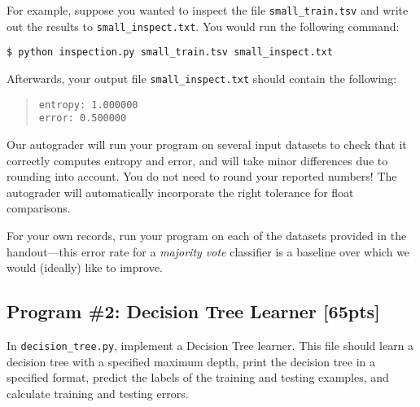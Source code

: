\documentclass[11pt,addpoints,answers]{exam}
\begin{document}
For example, suppose you wanted to inspect the file \lstinline{small_train.tsv} and write out the results to \lstinline{small_inspect.txt}. You would run the following command:
%
\begin{lstlisting}[language=Shell]
$ python inspection.py small_train.tsv small_inspect.txt
\end{lstlisting}
%
Afterwards, your output file \lstinline{small_inspect.txt} should contain the following:
%
\begin{quote}
\begin{verbatim}
entropy: 1.000000
error: 0.500000
\end{verbatim}
\end{quote}
%
Our autograder will run your program on several input datasets to check that it correctly computes entropy and error, and will take minor differences due to rounding into account. You do not need to round your reported numbers! The autograder will automatically incorporate the right tolerance for float comparisons.

\begin{notebox}
For your own records, run your program on each of the datasets provided in the handout---this error rate for a \emph{majority vote} classifier is a baseline over which we would (ideally) like to improve.
\end{notebox}

\newpage
\subsection{Program \#2: Decision Tree Learner [65pts]}
\label{sec:decisiontree}

In \texttt{decision\_tree.py}, implement a Decision Tree learner. This file should learn a decision tree with a specified maximum depth, print the decision tree in a specified format, predict the labels of the training and testing examples, and calculate training and testing errors.
\end{document}
